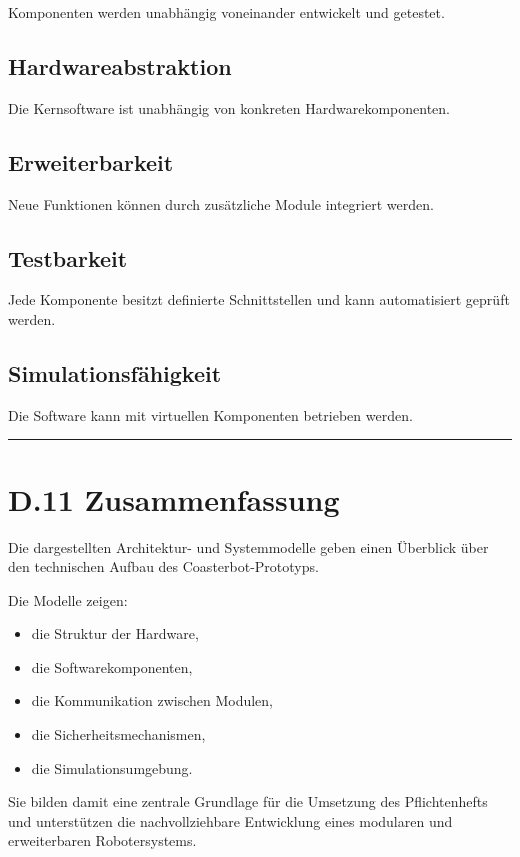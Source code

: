 \documentclass[
]{article}
\providecommand{\tightlist}{%
  \setlength{\itemsep}{0pt}\setlength{\parskip}{0pt}}
\begin{document}
Komponenten werden unabhängig voneinander entwickelt und getestet.

\subsection{Hardwareabstraktion}\label{hardwareabstraktion-1}

Die Kernsoftware ist unabhängig von konkreten Hardwarekomponenten.

\subsection{Erweiterbarkeit}\label{erweiterbarkeit-1}

Neue Funktionen können durch zusätzliche Module integriert werden.

\subsection{Testbarkeit}\label{testbarkeit-1}

Jede Komponente besitzt definierte Schnittstellen und kann automatisiert
geprüft werden.

\subsection{Simulationsfähigkeit}\label{simulationsfuxe4higkeit-1}

Die Software kann mit virtuellen Komponenten betrieben werden.

\begin{center}\rule{0.5\linewidth}{0.5pt}\end{center}

\section{D.11 Zusammenfassung}\label{d.11-zusammenfassung}

Die dargestellten Architektur- und Systemmodelle geben einen Überblick
über den technischen Aufbau des Coasterbot-Prototyps.

Die Modelle zeigen:

\begin{itemize}
\tightlist
\item
  die Struktur der Hardware,
\item
  die Softwarekomponenten,
\item
  die Kommunikation zwischen Modulen,
\item
  die Sicherheitsmechanismen,
\item
  die Simulationsumgebung.
\end{itemize}

Sie bilden damit eine zentrale Grundlage für die Umsetzung des
Pflichtenhefts und unterstützen die nachvollziehbare Entwicklung eines
modularen und erweiterbaren Robotersystems.
\end{document}
